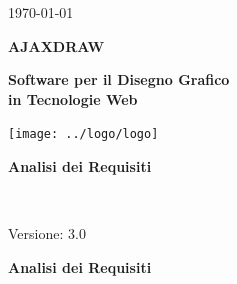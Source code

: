 \usepackage{multirow}


\renewcommand{\insertversion}{3.0} %
\renewcommand{\TITOLODOC}{Analisi dei Requisiti} %

\begin{titlepage}
\begin{center}
	\begin{Large}	\today \end{Large}
\end{center}

\vspace{20pt}

\begin{center}
	\begin{Huge}
				\textbf{AJAXDRAW}
	\end{Huge}
\end{center}			

\begin{center}
	\begin{large}
				\textbf{Software per il Disegno Grafico\\ in Tecnologie Web}
	\end{large}
\end{center}			

\vspace{20pt}

\begin{center}
\texttt{[image: ../logo/logo]}
\end{center}

\vspace{160pt}
\begin{center} %
	\begin{Huge}
				\textbf{\TITOLODOC}
	\end{Huge}
			\\
\end{center}
\vspace{200pt}
\begin{center}
Versione: \insertversion
\end{center}
\end{titlepage}

\newpage


\begin{center} %
	\begin{Huge}	
				\textbf{\TITOLODOC}
			\\
	\end{Huge}
\end{center}
\parindent=18pt %
